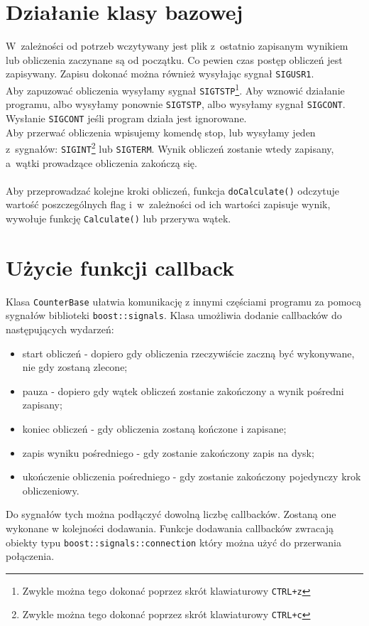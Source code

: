 \documentclass[a4paper]{article}
\begin{document}
\section{Działanie klasy bazowej}
W~zależności od potrzeb wczytywany jest plik z~ostatnio zapisanym wynikiem lub obliczenia zaczynane są od początku.
Co pewien czas postęp obliczeń jest zapisywany. 
Zapisu dokonać można również wysyłając sygnał \texttt{SIGUSR1}.\\
Aby zapuzować obliczenia wysyłamy sygnał \texttt{SIGTSTP}\footnote{Zwykle można tego dokonać poprzez skrót klawiaturowy \texttt{CTRL+z}}. 
Aby wznowić działanie programu, albo wysyłamy ponownie \texttt{SIGTSTP}, albo wysyłamy sygnał \texttt{SIGCONT}.
Wysłanie \texttt{SIGCONT} jeśli program działa jest ignorowane.\\
Aby przerwać obliczenia wpisujemy komendę stop, lub wysyłamy jeden z~sygnałów: \texttt{SIGINT}\footnote{Zwykle można tego dokonać poprzez skrót klawiaturowy \texttt{CTRL+c}} lub \texttt{SIGTERM}.
Wynik obliczeń zostanie wtedy zapisany, a~wątki prowadzące obliczenia zakończą się.\\
~\\
Aby przeprowadzać kolejne kroki obliczeń, funkcja \texttt{doCalculate()} odczytuje wartość poszczególnych flag i~w~zależności od ich wartości zapisuje wynik, wywołuje funkcję \texttt{Calculate()} lub przerywa wątek.

\section{Użycie funkcji callback}
Klasa \texttt{CounterBase} ułatwia komunikację z innymi częściami programu za pomocą sygnałów biblioteki \texttt{boost::signals}. 
Klasa umożliwia dodanie callbacków do następujących wydarzeń:
\begin{itemize}
\item start obliczeń - dopiero gdy obliczenia rzeczywiście zaczną być wykonywane, nie gdy zostaną zlecone;
\item pauza - dopiero gdy wątek obliczeń zostanie zakończony a wynik pośredni zapisany;
\item koniec obliczeń - gdy obliczenia zostaną kończone i zapisane;
\item zapis wyniku pośredniego - gdy zostanie zakończony zapis na dysk;
\item ukończenie obliczenia pośredniego - gdy zostanie zakończony pojedynczy krok obliczeniowy.
\end{itemize}
Do sygnałów tych można podłączyć dowolną liczbę callbacków.
Zostaną one wykonane w kolejności dodawania.
Funkcje dodawania callbacków zwracają obiekty typu \texttt{boost::signals::connection} który można użyć do przerwania połączenia.
\end{document}
